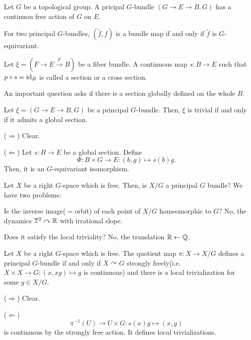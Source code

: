 \documentclass{../../small}
\begin{document}
Let $G$ be a topological group.
A pricipal $G$-bundle $(G\to E\to B,G)$ has a continuou free action of $G$ on $E$.

\begin{rmk*}
For two principal $G$-bundles, $(\tilde f,f)$ is a bundle map if and only if $\tilde f$ is $G$-equivariant.
\end{rmk*}

\begin{defn}
Let $\xi=(F\to E\xrightarrow{p}B)$ be a fiber bundle.
A continuous map $s:B\to E$ such that $p\circ s=\operatorname{id}_B$ is called a section or a cross section.

An important question asks if there is a section globally defined on the whole $B$.
\end{defn}

\begin{prop}
Let $\xi=(G\to E\to B,G)$ be a principal $G$-bundle.
Then, $\xi$ is trivial if and only if it admits a global section.
\end{prop}

\begin{pf}
($\Rightarrow$)
Clear.

($\Leftarrow$)
Let $s:B\to E$ be a global section.
Define
\[\Phi:B\times G\to E:(b,g)\mapsto s(b)g.\]
Then, it is an $G$-equivariant isomorphism.
\end{pf}


Let $X$ be a right $G$-space which is free.
Then, is $X/G$ a principal $G$ bundle?
We have two problems:
\begin{parts}
\item Is the inverse image($=$orbit) of each point of $X/G$ homeomorphic to $G$?
No, the dynamics $\mathbb{T}^2\curvearrowright\mathbb{R}$ with irrational slope.
\item Does it satisfy the local triviality?
No, the translation $\mathbb{R}\leftarrow\mathbb{Q}$.
\end{parts}

\begin{prop}
Let $X$ be a right $G$-space which is free.
The quotient map $\pi:X\to X/G$ defines a principal $G$-bundle if and only if $X\curvearrowright G$ strongly freely(i.e. $X\times X\to G:(x,xg)\mapsto g$ is continuous) and there is a local trivialization for some $y\in X/G$.
\end{prop}
\begin{pf}
($\Rightarrow$) Clear.

($\Leftarrow$)
\[\pi^{-1}(U)\to U\times G:s(x)g\mapsto(x,g)\]
is continuous by the strongly free action.
It defines local trivializations.
\end{pf}
\end{document}
